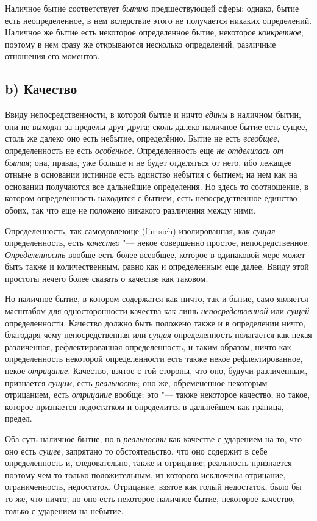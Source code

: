 Наличное бытие соответствует {\em бытию} предшествующей
сферы; однако, бытие есть неопределенное, в нем вследствие этого не
получается никаких определений. Наличное же бытие есть некоторое
определенное бытие, некоторое {\em конкретное}; поэтому
в нем сразу же открываются несколько определений, различные отношения его
моментов.

\subsection[b) Качество]{b) Качество}
Ввиду непосредственности, в которой бытие и ничто
{\em едины} в наличном бытии, они не выходят за пределы
друг друга; сколь далеко наличное бытие есть сущее, столь же далеко оно
есть небытие, определённо. Бытие не есть {\em всеобщее},
определенность не есть {\em особенное}. Определенность
еще {\em не отделилась от бытия}; она, правда, уже
больше и не будет отделяться от него, ибо лежащее отныне в основании
истинное есть единство небытия с бытием; на нем как на основании получаются
все дальнейшие определения. Но здесь то соотношение, в котором
определенность находится с бытием, есть непосредственное единство обоих,
так что еще не положено никакого различения между ними.

Определенность, так самодовлеюще (für sich) изолированная, как
{\em сущая} определенность, есть
{\em качество} "--- некое совершенно простое,
непосредственное. {\em Определенность} вообще есть
более всеобщее, которое в одинаковой мере может быть также и
количественным, равно как и определенным еще далее. Ввиду этой простоты
нечего более сказать о качестве как таковом.

Но наличное бытие, в котором содержатся как ничто, так и бытие, само
является масштабом для односторонности качества как лишь
{\em непосредственной} или {\em сущей} определенности. Качество должно быть
положено также и в определении ничто, благодаря чему непосредственная или
{\em сущая} определенность полагается как некая
различенная, рефлектированная определенность, и таким образом, ничто как
определенность некоторой определенности есть также некое рефлектированное,
некое {\em отрицание}. Качество, взятое с той стороны,
что оно, будучи различенным, признается {\em сущим},
есть {\em реальность}; оно же, обремененное некоторым
отрицанием, есть {\em отрицание} вообще; это "--- также
некоторое качество, но такое, которое признается недостатком и определится
в дальнейшем как граница, предел.

Оба суть наличное бытие; но в {\em реальности} как
качестве с ударением на то, что оно есть {\em сущее},
запрятано то обстоятельство, что оно содержит в себе определенность и,
следовательно, также и отрицание; реальность признается поэтому чем-то
только положительным, из которого исключены отрицание, ограниченность,
недостаток. Отрицание, взятое как голый недостаток, было бы то же, что
ничто; но оно есть некоторое наличное бытие, некоторое качество, только с
ударением на небытие.

